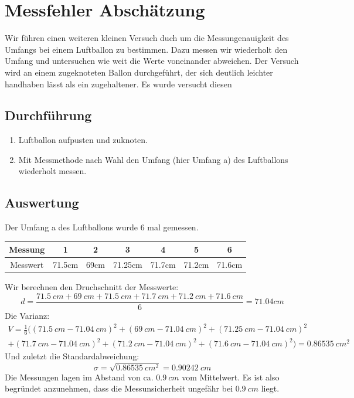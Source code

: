 \documentclass{article}
\begin{document}
    \section{Messfehler Abschätzung}\label{Messfehler_Umfang}
        Wir führen einen weiteren kleinen Versuch duch um die Messungenauigkeit des Umfangs bei einem Luftballon zu bestimmen.
        Dazu messen wir wiederholt den Umfang und untersuchen wie weit die Werte voneinander abweichen.
        Der Versuch wird an einem zugeknoteten Ballon durchgeführt, der sich deutlich leichter handhaben lässt als ein zugehaltener.
        Es wurde versucht diesen 
        \subsection{Durchführung}
            \begin{enumerate}
                \item Luftballon aufpusten und zuknoten.
                \item Mit Messmethode nach Wahl den Umfang (hier Umfang a) des Luftballons wiederholt messen.
            \end{enumerate}
        \subsection{Auswertung}
            Der Umfang a des Luftballons wurde 6 mal gemessen.
            \begin{center}
                \begin{tabular}{c c c c c c c}
                    Messung & 1 & 2 & 3 & 4 & 5 & 6 \\
                    \midrule
                    Messwert & 71.5cm & 69cm & 71.25cm & 71.7cm & 71.2cm & 71.6cm \\
                    
                \end{tabular}    
            \end{center}
        Wir berechnen den Druchschnitt der Messwerte:
        \[ d = \frac{ \SI{71.5}{cm} + \SI{69}{cm} + \SI{71.5}{cm} + \SI{71.7}{cm} + \SI{71.2}{cm} + \SI{71.6}{cm} }{ 6 }  = 71.04cm\]
        Die Varianz:
        \begin{gather*}
            V = \frac{1}{6} ( {( \SI{71.5}{cm} - \SI{71.04}{cm} )}^2 + {( \SI{69}{cm} - \SI{71.04}{cm} )}^2 + {( \SI{71.25}{cm} - \SI{71.04}{cm} )}^2 \\
               + {( \SI{71.7}{cm} - \SI{71.04}{cm} )}^2 + {( \SI{71.2}{cm} - \SI{71.04}{cm} )}^2 + {( \SI{71.6}{cm} - \SI{71.04}{cm} )}^2 )
             = \SI{0.86535}{{cm}^2}
        \end{gather*} 
        Und zuletzt die Standardabweichung:
        \[ \sigma = \sqrt{\SI{0.86535}{{cm}^2}}  = \SI{0.90242}{cm} \]
        Die Messungen lagen im Abstand von ca. \(\SI{0.9}{cm}\) vom Mittelwert.
        Es ist also begründet anzunehmen, dass die Messunsicherheit ungefähr bei \(\SI{0.9}{cm}\) liegt.\cite{Standardabweichung}
    
\end{document}
